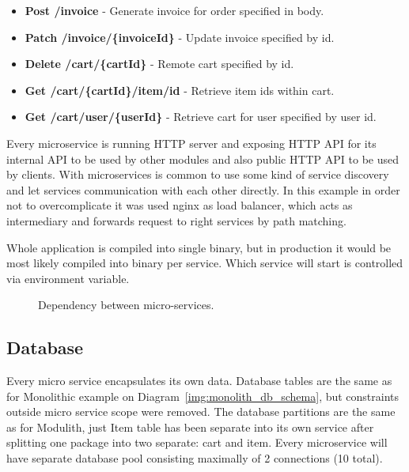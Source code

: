 \begin{itemize}
    \item \textbf{Post /invoice} - Generate invoice for order specified in body.
    \item \textbf{Patch /invoice/\{invoiceId\}} - Update invoice specified by id.
    \item \textbf{Delete /cart/\{cartId\}} - Remote cart specified by id.
    \item \textbf{Get /cart/\{cartId\}/item/id} - Retrieve item ids within cart.
    \item \textbf{Get /cart/user/\{userId\}} - Retrieve cart for user specified by user id.
\end{itemize}

Every microservice is running HTTP server and exposing HTTP API for its internal API to be used by other modules and also public HTTP API to be used by clients. With microservices is common to use some kind of service discovery and let services communication with each other directly. In this example in order not to overcomplicate it was used nginx as load balancer, which acts as intermediary and forwards request to right services by path matching.

Whole application is compiled into single binary, but in production it would be most likely compiled into binary per service. Which service will start is controlled via environment variable.

\begin{figure}
    \centering
    
    \caption{Dependency between micro-services. \label{img:microservices_dependency}}
\end{figure}

\subsection{Database}
Every micro service encapsulates its own data. Database tables are the same as for Monolithic example on Diagram~\ref{img:monolith_db_schema}, but constraints outside micro service scope were removed. The database partitions are the same as for Modulith, just Item table has been separate into its own service after splitting one package into two separate: cart and item. Every microservice will have separate database pool consisting maximally of 2 connections (10 total).



